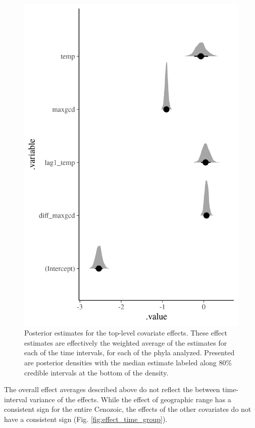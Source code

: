 \documentclass[12pt,letterpaper]{article}
\begin{document}
\begin{figure}[ht]
  \centering
  \includegraphics[width=\textwidth,height=0.5\textheight,keepaspectratio=true]{../results/figure/effect_est}
  \caption{Posterior estimates for the top-level covariate effects. These effect estimates are effectively the weighted average of the estimates for each of the time intervals, for each of the phyla analyzed. Presented are posterior densities with the median estimate labeled along 80\% credible intervals at the bottom of the density.}
  \label{fig:effect_est}
\end{figure}


The overall effect averages described above do not reflect the between time-interval variance of the effects. While the effect of geographic range has a consistent sign for the entire Cenozoic, the effects of the other covariates do not have a consistent sign (Fig. \ref{fig:effect_time_group}). 
\end{document}
